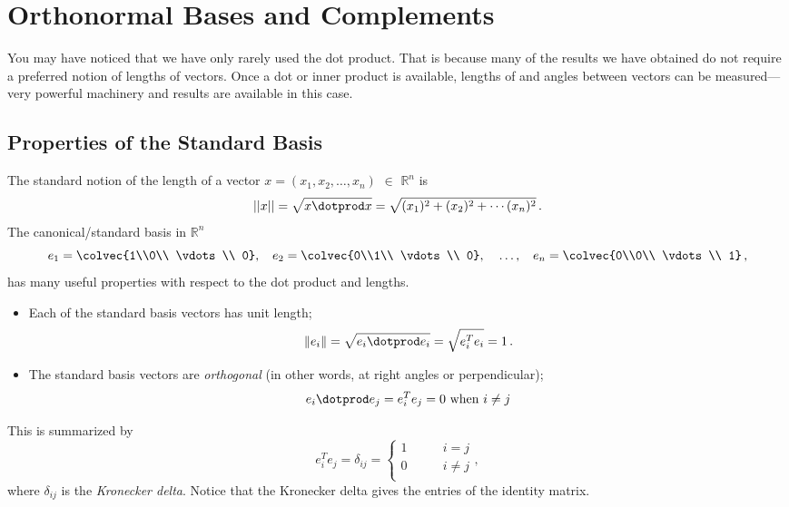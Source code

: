 \chapter{Orthonormal Bases and Complements}\label{orthonormalbases}

You may have noticed that we have only rarely used the dot product. That is because many of the
results we have obtained do not require a preferred notion of lengths of vectors. Once a dot or inner product
is available, lengths of and angles between vectors can be measured---very powerful machinery and results are available
in this case.

\section{Properties of the Standard Basis}

The standard notion of the length of a vector $x=(x_1,x_2,\ldots,x_n)$ $\in$ ${\mathbb R}^n$ is 
\[||x||=\sqrt{x\dotprod x}=\sqrt{(x_1)^2+(x_2)^2+\cdots(x_n)^2}\, .\]
The canonical/standard basis in ${\mathbb R}^n$
\[
e_1=\colvec{1\\0\\ \vdots \\ 0}, \phantom{X}
e_2=\colvec{0\\1\\ \vdots \\ 0}, \phantom{X} \ldots, 
\phantom{X} e_n=\colvec{0\\0\\ \vdots \\ 1}\, ,
\]
has many useful properties with respect to the dot product and lengths.
\begin{itemize}
\item Each of the standard basis vectors has unit length;
\[
\|e_i\|=\sqrt{e_i\dotprod e_i}=\sqrt{e_i^Te_i}=1\, .\]
\item The standard basis vectors are \emph{orthogonal}\label{orthogonal} (in other words, at right angles or perpendicular); 
\[
e_i\dotprod e_j = e_i^Te_j=0 \text{ when } i\neq j
\]
\end{itemize}
This is summarized by
\[
e_i^Te_j=\delta_{ij}=\left\{ \begin{array}{cc}
1 & \qquad i=j \\
0 & \qquad i\neq j \\
\end{array}\right. ,
\]
where $\delta_{ij}$ is the \emph{Kronecker delta}.  Notice that the Kronecker delta gives the entries of the identity matrix.


